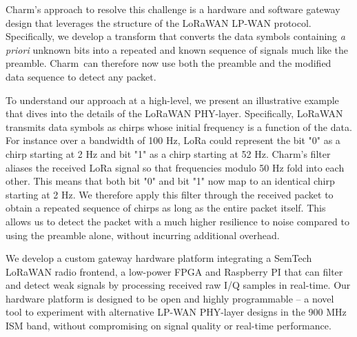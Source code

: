 Charm's approach to resolve this challenge is a hardware and software gateway design that leverages the structure of the LoRaWAN LP-WAN protocol. Specifically, we develop a transform that converts the data symbols containing \textit{a priori} unknown bits into a repeated and known sequence of signals much like the preamble. Charm\ can therefore now use both the preamble and the modified data sequence to detect any packet. 


To understand our approach at a high-level, we present an illustrative example that dives into the details of the LoRaWAN PHY-layer. Specifically, LoRaWAN transmits data symbols as chirps whose initial frequency is a function of the data. For instance over a bandwidth of 100 Hz, LoRa could represent the bit "0" as a chirp starting at 2 Hz and bit "1" as a chirp starting at 52 Hz. Charm's filter aliases the received LoRa signal so that frequencies modulo 50 Hz fold into each other. This means that both bit "0" and bit "1" now map to an identical chirp starting at 2 Hz. We therefore apply this filter through the received packet to obtain a repeated sequence of chirps as long as the entire packet itself. This allows us to detect the packet with a much higher resilience to noise compared to using the preamble alone, without incurring additional overhead. 

We develop a custom gateway hardware platform integrating a SemTech LoRaWAN radio frontend, a low-power FPGA and Raspberry PI that can filter and detect weak signals by processing received raw I/Q samples in real-time. Our hardware platform is designed to be open and highly programmable -- a novel tool to experiment with alternative LP-WAN PHY-layer designs in the 900 MHz ISM band, without compromising on signal quality or real-time performance. 
 



